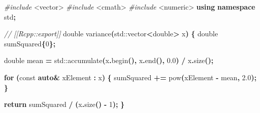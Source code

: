 \documentclass[
]{book}
\newenvironment{Shaded}{\begin{snugshade}}{\end{snugshade}}
\newcommand{\AttributeTok}[1]{\textcolor[rgb]{0.77,0.63,0.00}{#1}}
\newcommand{\BuiltInTok}[1]{#1}
\newcommand{\CommentTok}[1]{\textcolor[rgb]{0.56,0.35,0.01}{\textit{#1}}}
\newcommand{\ControlFlowTok}[1]{\textcolor[rgb]{0.13,0.29,0.53}{\textbf{#1}}}
\newcommand{\DataTypeTok}[1]{\textcolor[rgb]{0.13,0.29,0.53}{#1}}
\newcommand{\DecValTok}[1]{\textcolor[rgb]{0.00,0.00,0.81}{#1}}
\newcommand{\FloatTok}[1]{\textcolor[rgb]{0.00,0.00,0.81}{#1}}
\newcommand{\ImportTok}[1]{#1}
\newcommand{\KeywordTok}[1]{\textcolor[rgb]{0.13,0.29,0.53}{\textbf{#1}}}
\newcommand{\NormalTok}[1]{#1}
\newcommand{\OperatorTok}[1]{\textcolor[rgb]{0.81,0.36,0.00}{\textbf{#1}}}
\newcommand{\PreprocessorTok}[1]{\textcolor[rgb]{0.56,0.35,0.01}{\textit{#1}}}
\begin{document}
\begin{Shaded}
\begin{Highlighting}[]
\PreprocessorTok{\#include }\ImportTok{\textless{}vector\textgreater{}}
\PreprocessorTok{\#include }\ImportTok{\textless{}cmath\textgreater{}}
\PreprocessorTok{\#include }\ImportTok{\textless{}numeric\textgreater{}}
\KeywordTok{using} \KeywordTok{namespace}\NormalTok{ std}\OperatorTok{;}

\CommentTok{// [[Rcpp::export]]}
\DataTypeTok{double}\NormalTok{ variance}\OperatorTok{(}\BuiltInTok{std::}\NormalTok{vector}\OperatorTok{\textless{}}\DataTypeTok{double}\OperatorTok{\textgreater{}}\NormalTok{ x}\OperatorTok{)}
\OperatorTok{\{}
    \DataTypeTok{double}\NormalTok{ sumSquared}\OperatorTok{\{}\DecValTok{0}\OperatorTok{\};}

    \DataTypeTok{double}\NormalTok{ mean }\OperatorTok{=} \BuiltInTok{std::}\NormalTok{accumulate}\OperatorTok{(}\NormalTok{x}\OperatorTok{.}\NormalTok{begin}\OperatorTok{(),}\NormalTok{ x}\OperatorTok{.}\NormalTok{end}\OperatorTok{(),} \FloatTok{0.0}\OperatorTok{)} \OperatorTok{/}\NormalTok{ x}\OperatorTok{.}\NormalTok{size}\OperatorTok{();}

    \ControlFlowTok{for} \OperatorTok{(}\AttributeTok{const} \KeywordTok{auto}\OperatorTok{\&}\NormalTok{ xElement }\OperatorTok{:}\NormalTok{ x}\OperatorTok{)}
    \OperatorTok{\{}
\NormalTok{        sumSquared }\OperatorTok{+=}\NormalTok{ pow}\OperatorTok{(}\NormalTok{xElement }\OperatorTok{{-}}\NormalTok{ mean}\OperatorTok{,} \FloatTok{2.0}\OperatorTok{);}
    \OperatorTok{\}}

    \ControlFlowTok{return}\NormalTok{ sumSquared }\OperatorTok{/} \OperatorTok{(}\NormalTok{x}\OperatorTok{.}\NormalTok{size}\OperatorTok{()} \OperatorTok{{-}} \DecValTok{1}\OperatorTok{);}
\OperatorTok{\}}
\end{Highlighting}
\end{Shaded}
\end{document}
